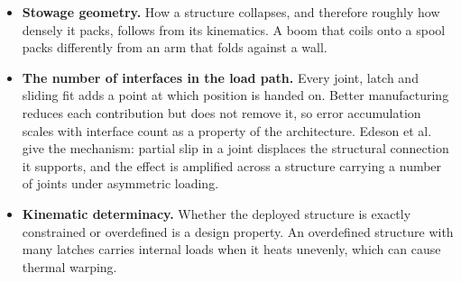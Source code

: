 \begin{itemize}
    \item \textbf{Stowage geometry.} How a structure collapses, and therefore roughly how densely it packs, follows from its kinematics. A boom that coils onto a spool packs differently from an arm that folds against a wall.
    \item \textbf{The number of interfaces in the load path.} Every joint, latch and sliding fit adds a point at which position is handed on. Better manufacturing reduces each contribution but does not remove it, so error accumulation scales with interface count as a property of the architecture. Edeson et al. \cite{edeson_conventional_2010} give the mechanism: partial slip in a joint displaces the structural connection it supports, and the effect is amplified across a structure carrying a number of joints under asymmetric loading.
    \item \textbf{Kinematic determinacy.} Whether the deployed structure is exactly constrained or overdefined is a design property. An overdefined structure with many latches carries internal loads when it heats unevenly, which can cause thermal warping.
    

\end{itemize}
